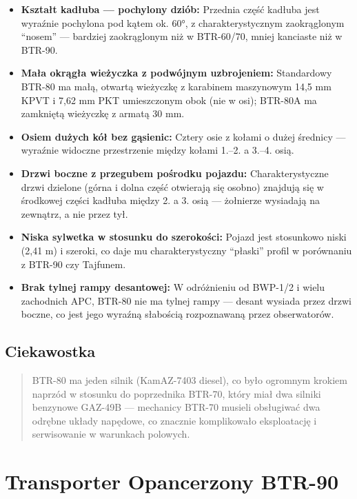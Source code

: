 \documentclass[12pt,openany,oneside]{book}
\providecommand{\tightlist}{%
  \setlength{\itemsep}{0pt}\setlength{\parskip}{0pt}}
\begin{document}
\begin{itemize}
\tightlist
\item
  \textbf{Kształt kadłuba --- pochylony dziób:} Przednia część kadłuba
  jest wyraźnie pochylona pod kątem ok. 60°, z charakterystycznym
  zaokrąglonym ``nosem'' --- bardziej zaokrąglonym niż w BTR-60/70,
  mniej kanciaste niż w BTR-90.
\item
  \textbf{Mała okrągła wieżyczka z podwójnym uzbrojeniem:} Standardowy
  BTR-80 ma małą, otwartą wieżyczkę z karabinem maszynowym 14,5 mm KPVT
  i 7,62 mm PKT umieszczonym obok (nie w osi); BTR-80A ma zamkniętą
  wieżyczkę z armatą 30 mm.
\item
  \textbf{Osiem dużych kół bez gąsienic:} Cztery osie z kołami o dużej
  średnicy --- wyraźnie widoczne przestrzenie między kołami 1.--2. a
  3.--4. osią.
\item
  \textbf{Drzwi boczne z przegubem pośrodku pojazdu:} Charakterystyczne
  drzwi dzielone (górna i dolna część otwierają się osobno) znajdują się
  w środkowej części kadłuba między 2. a 3. osią --- żołnierze wysiadają
  na zewnątrz, a nie przez tył.
\item
  \textbf{Niska sylwetka w stosunku do szerokości:} Pojazd jest
  stosunkowo niski (2,41 m) i szeroki, co daje mu charakterystyczny
  ``płaski'' profil w porównaniu z BTR-90 czy Tajfunem.
\item
  \textbf{Brak tylnej rampy desantowej:} W odróżnieniu od BWP-1/2 i
  wielu zachodnich APC, BTR-80 nie ma tylnej rampy --- desant wysiada
  przez drzwi boczne, co jest jego wyraźną słabością rozpoznawaną przez
  obserwatorów.
\end{itemize}

\section{Ciekawostka}\label{ciekawostka-6}

\begin{quote}
BTR-80 ma jeden silnik (KamAZ-7403 diesel), co było ogromnym krokiem
naprzód w stosunku do poprzednika BTR-70, który miał dwa silniki
benzynowe GAZ-49B --- mechanicy BTR-70 musieli obsługiwać dwa odrębne
układy napędowe, co znacznie komplikowało eksploatację i serwisowanie w
warunkach polowych.
\end{quote}

\chapter{Transporter Opancerzony
BTR-90}\label{transporter-opancerzony-btr-90}
\end{document}
